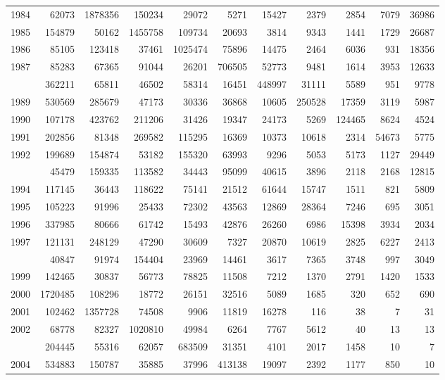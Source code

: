 \documentclass[
]{article}
\begin{document}
\begin{longtable}[t]{lrrrrrrrrrr}
1984 & 62073 & 1878356 & 150234 & 29072 & 5271 & 15427 & 2379 & 2854 & 7079 & 36986\\
1985 & 154879 & 50162 & 1455758 & 109734 & 20693 & 3814 & 9343 & 1441 & 1729 & 26687\\
1986 & 85105 & 123418 & 37461 & 1025474 & 75896 & 14475 & 2464 & 6036 & 931 & 18356\\
1987 & 85283 & 67365 & 91044 & 26201 & 706505 & 52773 & 9481 & 1614 & 3953 & 12633\\
\addlinespace
1988 & 362211 & 65811 & 46502 & 58314 & 16451 & 448997 & 31111 & 5589 & 951 & 9778\\
1989 & 530569 & 285679 & 47173 & 30336 & 36868 & 10605 & 250528 & 17359 & 3119 & 5987\\
1990 & 107178 & 423762 & 211206 & 31426 & 19347 & 24173 & 5269 & 124465 & 8624 & 4524\\
1991 & 202856 & 81348 & 269582 & 115295 & 16369 & 10373 & 10618 & 2314 & 54673 & 5775\\
1992 & 199689 & 154874 & 53182 & 155320 & 63993 & 9296 & 5053 & 5173 & 1127 & 29449\\
\addlinespace
1993 & 45479 & 159335 & 113582 & 34443 & 95099 & 40615 & 3896 & 2118 & 2168 & 12815\\
1994 & 117145 & 36443 & 118622 & 75141 & 21512 & 61644 & 15747 & 1511 & 821 & 5809\\
1995 & 105223 & 91996 & 25433 & 72302 & 43563 & 12869 & 28364 & 7246 & 695 & 3051\\
1996 & 337985 & 80666 & 61742 & 15493 & 42876 & 26260 & 6986 & 15398 & 3934 & 2034\\
1997 & 121131 & 248129 & 47290 & 30609 & 7327 & 20870 & 10619 & 2825 & 6227 & 2413\\
\addlinespace
1998 & 40847 & 91974 & 154404 & 23969 & 14461 & 3617 & 7365 & 3748 & 997 & 3049\\
1999 & 142465 & 30837 & 56773 & 78825 & 11508 & 7212 & 1370 & 2791 & 1420 & 1533\\
2000 & 1720485 & 108296 & 18772 & 26151 & 32516 & 5089 & 1685 & 320 & 652 & 690\\
2001 & 102462 & 1357728 & 74508 & 9906 & 11819 & 16278 & 116 & 38 & 7 & 31\\
2002 & 68778 & 82327 & 1020810 & 49984 & 6264 & 7767 & 5612 & 40 & 13 & 13\\
\addlinespace
2003 & 204445 & 55316 & 62057 & 683509 & 31351 & 4101 & 2017 & 1458 & 10 & 7\\
2004 & 534883 & 150787 & 35885 & 37996 & 413138 & 19097 & 2392 & 1177 & 850 & 10\\

\end{longtable}
\end{document}
